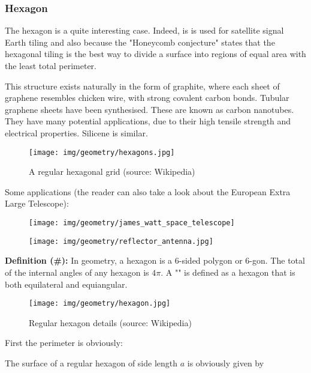 {	\subsubsection{Hexagon}	
	The hexagon is a quite interesting case. Indeed, is is used for satellite signal Earth tiling and also because  the "Honeycomb conjecture" states that the hexagonal tiling is the best way to divide a surface into regions of equal area with the least total perimeter. 	
	
	This structure exists naturally in the form of graphite, where each sheet of graphene resembles chicken wire, with strong covalent carbon bonds. Tubular graphene sheets have been synthesised. These are known as carbon nanotubes. They have many potential applications, due to their high tensile strength and electrical properties. Silicene is similar.
	\begin{figure}[H]
		\centering
		\texttt{[image: img/geometry/hexagons.jpg]}
		\caption[A regular hexagonal grid]{A regular hexagonal grid (source: Wikipedia)}
	\end{figure}
	Some applications (the reader can also take a look about the European Extra Large Telescope):
	\begin{figure}[H]
		\centering
		\begin{minipage}{.5\textwidth}
		  \centering
		  \texttt{[image: img/geometry/james\_watt\_space\_telescope]}
		\end{minipage}%
		\begin{minipage}{.5\textwidth}
		  \centering
		  \texttt{[image: img/geometry/reflector\_antenna.jpg]}
		\end{minipage}
	\end{figure}
	
	\textbf{Definition (\#\mydef):} In geometry, a hexagon is a $6$-sided polygon or $6$-gon. The total of the internal angles of any hexagon is $4\pi$. A "" is defined as a hexagon that is both equilateral and equiangular.
	\begin{figure}[H]
		\centering
		\texttt{[image: img/geometry/hexagon.jpg]}
		\caption[Regular hexagon details]{Regular hexagon details (source: Wikipedia)}
	\end{figure}
	First the perimeter is obviously:
	
	The surface of a regular hexagon of side length $a$ is obviously given by
	
}
